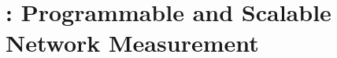 \chapter{\TheSystem: Programmable and Scalable Network Measurement}
\label{chap:perf_query}








